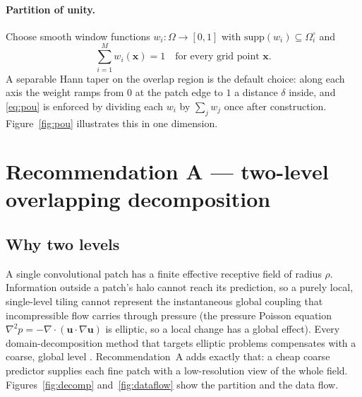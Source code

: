 \documentclass[11pt]{article}
\begin{document}
\paragraph{Partition of unity.}
Choose smooth window functions $w_i : \Omega \to [0,1]$ with
$\mathrm{supp}(w_i)\subseteq\Omega_i^\circ$ and
\begin{equation}
\sum_{i=1}^{M} w_i(\bm x) = 1 \quad\text{for every grid point } \bm x .
\label{eq:pou}
\end{equation}
A separable Hann taper on the overlap region is the default choice: along each
axis the weight ramps from $0$ at the patch edge to $1$ a distance $\delta$
inside, and \eqref{eq:pou} is enforced by dividing each $w_i$ by
$\sum_j w_j$ once after construction. Figure~\ref{fig:pou} illustrates this in
one dimension.

\section{Recommendation A --- two-level overlapping decomposition}\label{sec:recA}

\subsection{Why two levels}
A single convolutional patch has a finite effective receptive field of radius
$\rho$. Information outside a patch's halo cannot reach its prediction, so a
purely local, single-level tiling cannot represent the instantaneous global
coupling that incompressible flow carries through pressure (the pressure Poisson
equation $\nabla^2 p = -\nabla\!\cdot(\bm u\!\cdot\!\nabla\bm u)$ is elliptic, so
a local change has a global effect). Every domain-decomposition method that
targets elliptic problems compensates with a coarse, global level
\cite{dryja1994smalloverlap,dolean2024multilevel,li2020mgno}. Recommendation~A
adds exactly that: a cheap coarse predictor supplies each fine patch with a
low-resolution view of the whole field. Figures~\ref{fig:decomp}
and~\ref{fig:dataflow} show the partition and the data flow.
\end{document}
